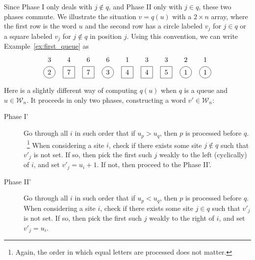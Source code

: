 \documentclass[reqno]{amsart}
\newcommand{\0}{\phantom{c}}
\DeclareMathOperator{\inter}{int} %
\newcommand{\mcW}{\mathcal{W}}
\newcommand{\tup}[1]{\left( #1 \right)}
\newcommand{\defn}[1]{{\color{darkred}\emph{#1}}} %
\theoremstyle{plain}
\theoremstyle{definition}
\numberwithin{equation}{section}
\begin{document}
Since Phase I only deals with $j \notin q$, and Phase II only with $j\in q$, these two phases commute.
We illustrate the situation $v = q(u)$ with a $2 \times n$ array, where the first row is the word $u$
and the second row has a circle labeled $v_j$ for $j \in q$ or a square labeled $v_j$ for $j \notin q$ in position $j$.
Using this convention, we can write Example~\ref{ex:first_queue} as
\[
\begin{tikzpicture}[baseline=10]
  \def\ll{0.65}   %
  \foreach \i in {5,9} { \node at (\i,\ll) {$1$}; }
  \foreach \i in {8} { \node at (\i,\ll) {$2$}; }
  \foreach \i in {1,6,7} { \node at (\i,\ll) {$3$}; }
  \foreach \i in {2} { \node at (\i,\ll) {$4$}; }
  \foreach \i in {3,4} { \node at (\i,\ll) {$6$}; }
  \foreach \i in {1,4,8,9} { \draw (\i,0) circle (0.3); }
  \foreach \i in {2,3,5,6,7} { \draw (\i-.3,0-.3) rectangle +(0.6,+0.6); }
  \foreach \i in {8,9} { \node at (\i,0) {$1$}; }
  \foreach \i in {1} { \node at (\i,0) {$2$}; }
  \foreach \i in {4} { \node at (\i,0) {$3$}; }
  \foreach \i in {5,6} { \node at (\i,0) {$4$}; }
  \foreach \i in {7} { \node at (\i,0) {$5$}; }
  \foreach \i in {2,3} { \node at (\i,0) {$7$}; }
\end{tikzpicture}
\]

\begin{comment}  %
Consider a pair $k, k+1 \pmod{n}$ of consecutive columns.
For $s > t$ the \defn{$s$-flow} from $k+1$ to $k$ is the number of $i$ such that $u_i=s$, and whose queueing interval $\inter[j,i]$ contains both $k$ and $k+1$.
Similarly, for $s < t$, the \defn{$s$-flow} from $k$ to $k+1$ is the number of $i$ such that $u_i = s$, and whose queueing interval $\inter[i,j]$ contains both $k$ and $k+1$.
\end{comment}

Here is a slightly different way of computing $q \tup{u}$ when $q$ is a queue and $u \in \mcW_n$. It proceeds in only two phases, constructing a word $v' \in \mcW_n$:

\begin{description}
\item[Phase I']
  Go through all $i$ in such order that if $u_p > u_q$, then $p$ is processed before $q$.
  \ \footnote{Again, the order in which equal letters are processed does not matter.}
  When considering a site $i$, check if there exists some site $j \notin q$ such that $v'_j$ is not set.
  If so, then pick the first such $j$ weakly to the left (cyclically) of $i$, and set $v'_j = u_i + 1$.
  If not, then proceed to the Phase II'.

\item[Phase II']
  Go through all $i$ in such order that if $u_p < u_q$, then $p$ is processed before $q$.
  When considering a site $i$, check if there exists some site $j \in q$ such that $v'_j$ is not set.
  If so, then pick the first such $j$ weakly to the right of $i$, and set $v'_j = u_i$.
\end{description}
\end{document}
